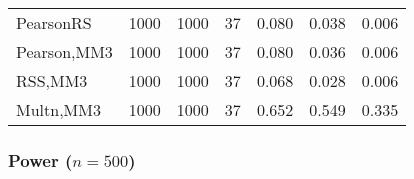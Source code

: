 \documentclass[
]{article}
\begin{document}
\begin{table}[H]
{\begin{tabular}[t]{lrrrrrr}
\hspace{1em}PearsonRS & 1000 & 1000 & 37 & 0.080 & 0.038 & 0.006\\
\hspace{1em}Pearson,MM3 & 1000 & 1000 & 37 & 0.080 & 0.036 & 0.006\\
\hspace{1em}RSS,MM3 & 1000 & 1000 & 37 & 0.068 & 0.028 & 0.006\\
\hspace{1em}Multn,MM3 & 1000 & 1000 & 37 & 0.652 & 0.549 & 0.335\\
\bottomrule
\end{tabular}}
\end{table}

\hypertarget{power-n500-1}{%
\subsubsection{\texorpdfstring{Power
(\(n=500\))}{Power (n=500)}}\label{power-n500-1}}
\end{document}
